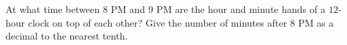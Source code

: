 At what time between 8 PM and 9 PM are the hour and minute hands of a $12$-hour clock on top of each other? Give the number of minutes after 8 PM as a decimal to the nearest tenth.
